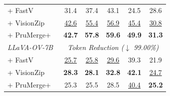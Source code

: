 \begin{table}[t]
{\begin{tabular}{l|c c c c c}
 \midrule
+ FastV~\cite{chen2024image} & 31.4 & 37.4 & 43.1 & 24.5 & 28.6\\
\rowcolor{gray!10}+ VisionZip~\cite{yang2025visionzip} & \underline{42.6} & \underline{55.4} & \underline{56.9} & \underline{45.4} & \underline{30.8}\\
+ PruMerge+~\cite{shang2024llava} & \textbf{42.7} & \textbf{57.8} & \textbf{59.6} & \textbf{49.9} & \textbf{31.3}\\
\midrule
\rowcolor{lightgrayblue} \textit{LLaVA-OV-7B~\cite{li2024llava}} & \multicolumn{5}{c}{\textit{Token Reduction ($\downarrow$ 99.00\%)}} \\
 \midrule
+ FastV~\cite{chen2024image} & \underline{25.7} & \underline{25.8} & \underline{29.6} & 39.3 & 21.9\\
\rowcolor{gray!10}+ VisionZip~\cite{yang2025visionzip} & \textbf{28.3} & \textbf{28.1} & \textbf{32.8} & \textbf{42.1} & \underline{24.7}\\
+ PruMerge+~\cite{shang2024llava} & 25.3 & 25.5 & 28.5 & \underline{40.4} & \textbf{25.2}\\
\bottomrule
\end{tabular}}
\end{table}
